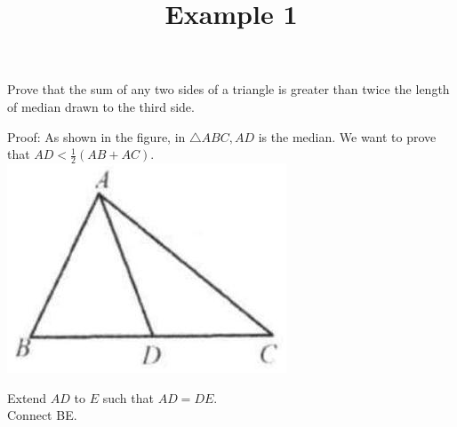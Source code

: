 \documentclass{article}
\title{Example 1}
\date{}
\begin{document}
\maketitle

Prove that the sum of any two sides of a triangle is greater than twice the length of median drawn to the third side.

Proof:
As shown in the figure, in \(\triangle A B C, A D\) is the median. We want to prove that \(A D<\frac{1}{2}(A B+A C)\).\\
\centering
\includegraphics[width=\textwidth]{images/problem_image_1.jpg}

Extend \(A D\) to \(E\) such that \(A D=D E\).\\
Connect BE.
\end{document}

